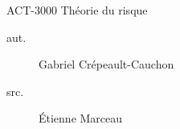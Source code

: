 \begin{contrib}{ACT-3000\: Théorie du risque}
\begin{description}
	\item[aut.] Gabriel Crépeault-Cauchon 
	\item[src.] Étienne Marceau 
\end{description}
\end{contrib}
